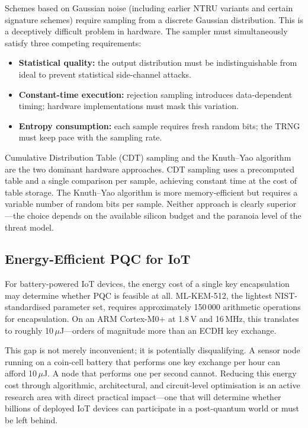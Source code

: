 Schemes based on Gaussian noise (including earlier NTRU variants and certain signature schemes) require sampling from a discrete Gaussian distribution.  This is a deceptively difficult problem in hardware.  The sampler must simultaneously satisfy three competing requirements:
\begin{itemize}
\item \textbf{Statistical quality:} the output distribution must be indistinguishable from ideal to prevent statistical side-channel attacks.
\item \textbf{Constant-time execution:} rejection sampling introduces data-dependent timing; hardware implementations must mask this variation.
\item \textbf{Entropy consumption:} each sample requires fresh random bits; the TRNG must keep pace with the sampling rate.
\end{itemize}

Cumulative Distribution Table (CDT) sampling and the Knuth--Yao algorithm are the two dominant hardware approaches.  CDT sampling uses a precomputed table and a single comparison per sample, achieving constant time at the cost of table storage.  The Knuth--Yao algorithm is more memory-efficient but requires a variable number of random bits per sample.  Neither approach is clearly superior---the choice depends on the available silicon budget and the paranoia level of the threat model.

\subsection{Energy-Efficient PQC for IoT}
\label{subsec:iot-energy}

For battery-powered IoT devices, the energy cost of a single key encapsulation may determine whether PQC is feasible at all.  ML-KEM-512, the lightest NIST-standardised parameter set, requires approximately 150\,000 arithmetic operations for encapsulation.  On an ARM Cortex-M0+ at 1.8\,V and 16\,MHz, this translates to roughly 10\,$\mu$J---orders of magnitude more than an ECDH key exchange.

This gap is not merely inconvenient; it is potentially disqualifying.  A sensor node running on a coin-cell battery that performs one key exchange per hour can afford 10\,$\mu$J.  A node that performs one per second cannot.  Reducing this energy cost through algorithmic, architectural, and circuit-level optimisation is an active research area with direct practical impact---one that will determine whether billions of deployed IoT devices can participate in a post-quantum world or must be left behind.


